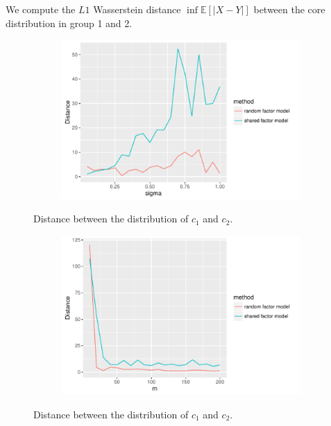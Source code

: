 \documentclass[12pt]{article}
\newcommand{\bfi}{\begin{figure}[H]}
\newcommand{\efi}{\end{figure}}
\newcommand{\bsfi}{\begin{subfigure}[t]}
\newcommand{\esfi}{\end{subfigure}}
\begin{document}

We compute the $L1$ Wasserstein distance $\inf \mathbb{E}[|X-Y|]$ between the core distribution in group 1 and 2.



\bfi
\centering
\bsfi{0.8\columnwidth}
\includegraphics[width=1\columnwidth]{../BatchEffectRemoval/dist_sigma}
\esfi
\caption{Distance between the distribution of $c_{1}$ and $c_{2}$.}
\efi

\bfi
\centering
\bsfi{0.8\columnwidth}
\includegraphics[width=1\columnwidth]{../BatchEffectRemoval/dist_M}
\esfi
\caption{Distance between the distribution of $c_{1}$ and $c_{2}$.}
\efi
\end{document}
